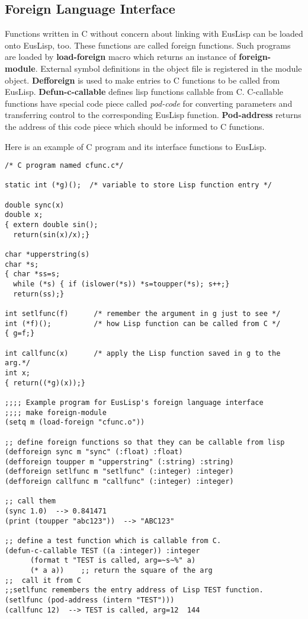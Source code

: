 \subsection{Foreign Language Interface}

Functions written in C without concern about linking with EusLisp
can be loaded onto EusLisp, too.
These functions are called foreign functions.
Such programs are loaded by
{\bf load-foreign} macro which returns an instance of {\bf foreign-module}.
External symbol definitions in the object file is registered
in the module object.
{\bf Defforeign} is used to make entries to  C functions
to be called from EusLisp.
{\bf Defun-c-callable} defines lisp functions callable from C.
C-callable functions have special code piece called {\em pod-code}
for converting parameters and transferring control to the corresponding
EusLisp function.
{\bf Pod-address} returns the address of this code piece which
should be informed to C functions.

Here is an example of C program and its interface functions to EusLisp.
\begin{verbatim}
/* C program named cfunc.c*/

static int (*g)();	/* variable to store Lisp function entry */

double sync(x)
double x;
{ extern double sin();
  return(sin(x)/x);}

char *upperstring(s)
char *s;
{ char *ss=s;
  while (*s) { if (islower(*s)) *s=toupper(*s); s++;}
  return(ss);}

int setlfunc(f)      /* remember the argument in g just to see */
int (*f)();          /* how Lisp function can be called from C */
{ g=f;}

int callfunc(x)      /* apply the Lisp function saved in g to the arg.*/
int x;
{ return((*g)(x));}

;;;; Example program for EusLisp's foreign language interface
;;;; make foreign-module
(setq m (load-foreign "cfunc.o"))

;; define foreign functions so that they can be callable from lisp
(defforeign sync m "sync" (:float) :float)
(defforeign toupper m "upperstring" (:string) :string)
(defforeign setlfunc m "setlfunc" (:integer) :integer)
(defforeign callfunc m "callfunc" (:integer) :integer)

;; call them
(sync 1.0)	--> 0.841471
(print (toupper "abc123"))  --> "ABC123"

;; define a test function which is callable from C.
(defun-c-callable TEST ((a :integer)) :integer
      (format t "TEST is called, arg=~s~%" a)
      (* a a))    ;; return the square of the arg
;;  call it from C
;;setlfunc remembers the entry address of Lisp TEST function.
(setlfunc (pod-address (intern "TEST")))
(callfunc 12)  --> TEST is called, arg=12  144
\end{verbatim}
  
